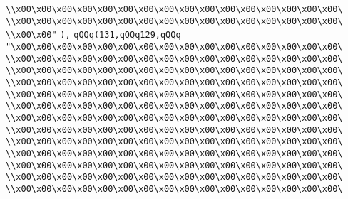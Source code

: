 \verb|\\x00\x00\x00\x00\x00\x00\x00\x00\x00\x00\x00\x00\x00\x00\x00\x00\|\newline
\verb|\\x00\x00\x00\x00\x00\x00\x00\x00\x00\x00\x00\x00\x00\x00\x00\x00\|\newline
\verb|\\x00\x00"|\newline
\verb|),|\newline
\verb|qQQq(131,qQQq129,qQQq|\newline
\verb|"\x00\x00\x00\x00\x00\x00\x00\x00\x00\x00\x00\x00\x00\x00\x00\x00\|\newline
\verb|\\x00\x00\x00\x00\x00\x00\x00\x00\x00\x00\x00\x00\x00\x00\x00\x00\|\newline
\verb|\\x00\x00\x00\x00\x00\x00\x00\x00\x00\x00\x00\x00\x00\x00\x00\x00\|\newline
\verb|\\x00\x00\x00\x00\x00\x00\x00\x00\x00\x00\x00\x00\x00\x00\x00\x00\|\newline
\verb|\\x00\x00\x00\x00\x00\x00\x00\x00\x00\x00\x00\x00\x00\x00\x00\x00\|\newline
\verb|\\x00\x00\x00\x00\x00\x00\x00\x00\x00\x00\x00\x00\x00\x00\x00\x00\|\newline
\verb|\\x00\x00\x00\x00\x00\x00\x00\x00\x00\x00\x00\x00\x00\x00\x00\x00\|\newline
\verb|\\x00\x00\x00\x00\x00\x00\x00\x00\x00\x00\x00\x00\x00\x00\x00\x00\|\newline
\verb|\\x00\x00\x00\x00\x00\x00\x00\x00\x00\x00\x00\x00\x00\x00\x00\x00\|\newline
\verb|\\x00\x00\x00\x00\x00\x00\x00\x00\x00\x00\x00\x00\x00\x00\x00\x00\|\newline
\verb|\\x00\x00\x00\x00\x00\x00\x00\x00\x00\x00\x00\x00\x00\x00\x00\x00\|\newline
\verb|\\x00\x00\x00\x00\x00\x00\x00\x00\x00\x00\x00\x00\x00\x00\x00\x00\|\newline
\verb|\\x00\x00\x00\x00\x00\x00\x00\x00\x00\x00\x00\x00\x00\x00\x00\x00\|\newline
